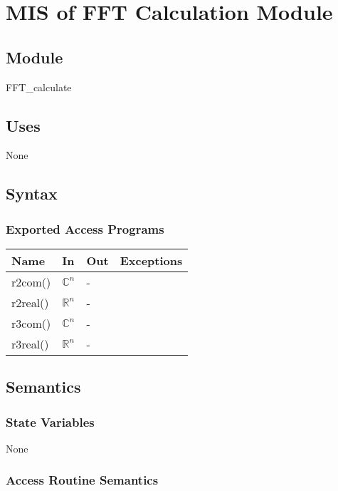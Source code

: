 \documentclass[12pt, titlepage]{article}
\begin{document}
\section{MIS of FFT Calculation Module} \label{Input} 

\subsection{Module}

FFT\_calculate

\subsection{Uses}
None
\subsection{Syntax}

\subsubsection{Exported Access Programs}

\begin{center}
\begin{tabular}{p{2cm} p{4cm} p{4cm} p{2cm}}
\hline
\textbf{Name} & \textbf{In} & \textbf{Out} & \textbf{Exceptions} \\
\hline
r2com() &$\mathbb{C}^ n$& - & \\
r2real()&$\mathbb{R}^ n$ & - & \\
r3com()&$\mathbb{C}^ n$ & - & \\
r3real()&$\mathbb{R}^ n$& -&\\

\hline
\end{tabular}
\end{center}

\subsection{Semantics}

\subsubsection{State Variables}
None

\subsubsection{Access Routine Semantics}
\end{document}
